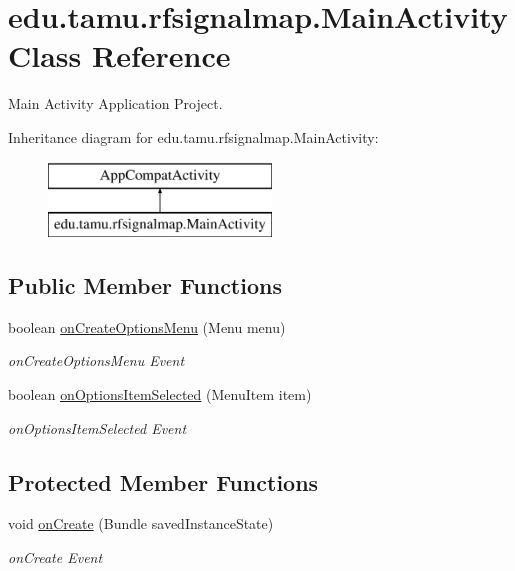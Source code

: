 \hypertarget{classedu_1_1tamu_1_1rfsignalmap_1_1_main_activity}{}\section{edu.\+tamu.\+rfsignalmap.\+Main\+Activity Class Reference}
\label{classedu_1_1tamu_1_1rfsignalmap_1_1_main_activity}


Main Activity Application Project.  


Inheritance diagram for edu.\+tamu.\+rfsignalmap.\+Main\+Activity\+:\begin{figure}[H]
\begin{center}
\leavevmode
\includegraphics[height=2.000000cm]{classedu_1_1tamu_1_1rfsignalmap_1_1_main_activity}
\end{center}
\end{figure}
\subsection*{Public Member Functions}
\begin{DoxyCompactItemize}
\item 
boolean \hyperlink{classedu_1_1tamu_1_1rfsignalmap_1_1_main_activity_ac14e5eb3ca09daa915b786a6ebfae930}{on\+Create\+Options\+Menu} (Menu menu)
\begin{DoxyCompactList}\small\item\em on\+Create\+Options\+Menu Event \end{DoxyCompactList}\item 
boolean \hyperlink{classedu_1_1tamu_1_1rfsignalmap_1_1_main_activity_a6ccd683ce4cf4baf19105c79124572aa}{on\+Options\+Item\+Selected} (Menu\+Item item)
\begin{DoxyCompactList}\small\item\em on\+Options\+Item\+Selected Event \end{DoxyCompactList}\end{DoxyCompactItemize}
\subsection*{Protected Member Functions}
\begin{DoxyCompactItemize}
\item 
void \hyperlink{classedu_1_1tamu_1_1rfsignalmap_1_1_main_activity_ac8abde5e0a0b83d54d7d8ddaf197b438}{on\+Create} (Bundle saved\+Instance\+State)
\begin{DoxyCompactList}\small\item\em on\+Create Event \end{DoxyCompactList}\end{DoxyCompactItemize}


